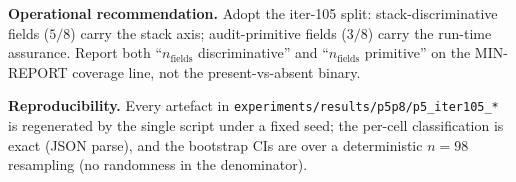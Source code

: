 \textbf{Operational recommendation.} Adopt the iter-105 split:
stack-discriminative fields ($5/8$) carry the stack axis; audit-primitive
fields ($3/8$) carry the run-time assurance. Report both
``$n_{\text{fields}}$ discriminative'' and ``$n_{\text{fields}}$
primitive'' on the MIN-REPORT coverage line, not the present-vs-absent
binary.

\textbf{Reproducibility.} Every artefact in
\texttt{experiments/results/p5p8/p5\_iter105\_*} is regenerated by the
single script under a fixed seed; the per-cell classification is exact
(JSON parse), and the bootstrap CIs are over a deterministic $n{=}98$
resampling (no randomness in the denominator).
